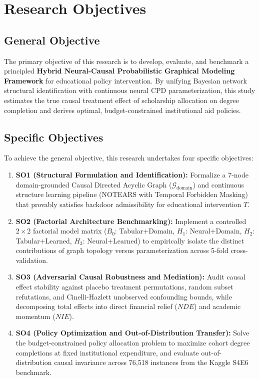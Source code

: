 \section{Research Objectives}

\subsection{General Objective}
The primary objective of this research is to develop, evaluate, and benchmark a principled \textbf{Hybrid Neural-Causal Probabilistic Graphical Modeling Framework} for educational policy intervention. By unifying Bayesian network structural identification with continuous neural CPD parameterization, this study estimates the true causal treatment effect of scholarship allocation on degree completion and derives optimal, budget-constrained institutional aid policies.

\subsection{Specific Objectives}
To achieve the general objective, this research undertakes four specific objectives:
\begin{enumerate}
    \item \textbf{SO1 (Structural Formulation and Identification):} Formalize a 7-node domain-grounded Causal Directed Acyclic Graph ($\mathcal{G}_{\text{domain}}$) and continuous structure learning pipeline (NOTEARS with Temporal Forbidden Masking) that provably satisfies backdoor admissibility for educational intervention $T$.
    \item \textbf{SO2 (Factorial Architecture Benchmarking):} Implement a controlled $2 \times 2$ factorial model matrix ($B_0$: Tabular+Domain, $H_1$: Neural+Domain, $H_2$: Tabular+Learned, $H_3$: Neural+Learned) to empirically isolate the distinct contributions of graph topology versus parameterization across 5-fold cross-validation.
    \item \textbf{SO3 (Adversarial Causal Robustness and Mediation):} Audit causal effect stability against placebo treatment permutations, random subset refutations, and Cinelli-Hazlett unobserved confounding bounds, while decomposing total effects into direct financial relief ($NDE$) and academic momentum ($NIE$).
    \item \textbf{SO4 (Policy Optimization and Out-of-Distribution Transfer):} Solve the budget-constrained policy allocation problem to maximize cohort degree completions at fixed institutional expenditure, and evaluate out-of-distribution causal invariance across 76,518 instances from the Kaggle S4E6 benchmark.
\end{enumerate}
